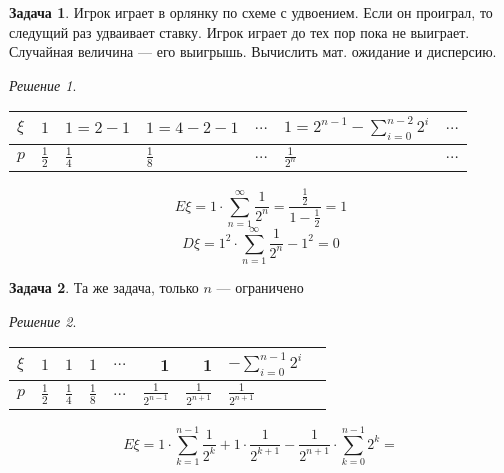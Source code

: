 \documentclass[english]{article}
\theoremstyle{plain}
\theoremstyle{remark}
\newtheorem*{solution}{Решение}
\theoremstyle{definition}
\newtheorem{task}{Задача}
\begin{document}
\begin{task}
Игрок играет в орлянку по схеме с удвоением. Если он проиграл, то следущий раз удваивает ставку. Игрок играет до тех пор пока не выиграет. Случайная величина --- его выигрышь. Вычислить мат. ожидание и дисперсию.
\end{task}
\begin{solution}
\-
\begin{center}
\begin{tabular}{l|llllll}
\(\xi\) & \(1\) & \(1 = 2 - 1\) & \(1 = 4 - 2 - 1\) & \(\dots\) & \(1 = 2^{n - 1} - \sum_{i = 0}^{n - 2}2^i\) & \(\dots\)\\
\hline
\(p\) & \(\frac{1}{2}\) & \(\frac{1}{4}\) & \(\frac{1}{8}\) & \(\dots\) & \(\frac{1}{2^n}\) & \(\dots\)\\
\end{tabular}
\end{center}
\[ E\xi = 1 \cdot \sum_{n = 1}^\infty \frac{1}{2^n} = \frac{\frac{1}{2}}{1 - \frac{1}{2}} = 1 \]
\[ D\xi = 1^2 \cdot \sum_{n = 1}^\infty \frac{1}{2^n} - 1^2 = 0 \]
\end{solution}
\begin{task}
Та же задача, только \(n\) --- ограничено
\end{task}
\begin{solution}
\begin{center}
\begin{tabular}{l|llllrrll}
\(\xi\) & \(1\) & \(1\) & \(1\) & \(\dots\) & 1 & 1 & \(-\sum_{i = 0}^{n - 1}2 ^i\) & \\
\hline
\(p\) & \(\frac{1}{2}\) & \(\frac{1}{4}\) & \(\frac{1}{8}\) & \(\dots\) & \(\frac{1}{2^{n - 1}}\) & \(\frac{1}{2^{n + 1}}\) & \(\frac{1}{2^{n + 1}}\) & \\
\end{tabular}
\end{center}
\[ E\xi = 1\cdot \sum_{k = 1}^{n - 1} \frac{1}{2^k} + 1\cdot \frac{1}{2^{k + 1}} - \frac{1}{2^{n + 1}}\cdot \sum_{k = 0}^{n - 1}2^k =  \]
\end{solution}
\end{document}
